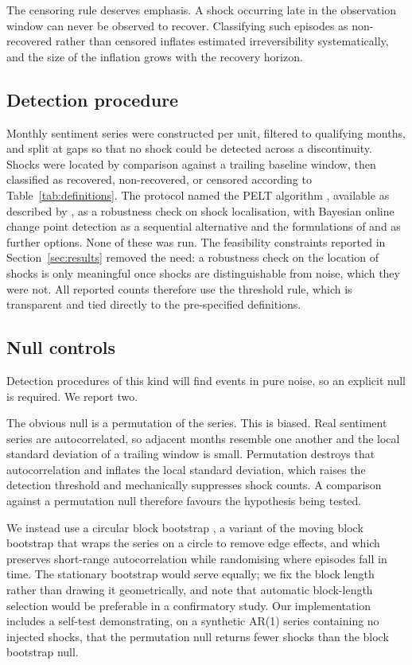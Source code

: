 \documentclass[11pt,a4paper]{article}
\makeatletter
\let\original@subsection\subsection
\renewcommand{\subsection}{\FloatBarrier\original@subsection}%
\makeatother
\begin{document}
The censoring rule deserves emphasis. A shock occurring late in the
observation window can never be observed to recover. Classifying such episodes
as non-recovered rather than censored inflates estimated irreversibility
systematically, and the size of the inflation grows with the recovery horizon.

\subsection{Detection procedure}

Monthly sentiment series were constructed per unit, filtered to qualifying
months, and split at gaps so that no shock could be detected across a
discontinuity. Shocks were located by comparison against a trailing baseline window, then
classified as recovered, non-recovered, or censored according to
Table~\ref{tab:definitions}. The protocol named the PELT algorithm \citep{killick2012}, available as
described by \citet{killick2014}, as a robustness check on shock localisation,
with Bayesian online change point detection \citep{adams2007} as a sequential
alternative and the formulations of \citet{barry1993} and \citet{fearnhead2007}
as further options. None of these was run. The feasibility constraints reported
in Section~\ref{sec:results} removed the need: a robustness check on the
location of shocks is only meaningful once shocks are distinguishable from
noise, which they were not. All reported counts therefore use the threshold
rule, which is transparent and tied directly to the pre-specified
definitions.

\subsection{Null controls}
\label{sec:nulls}

Detection procedures of this kind will find events in pure noise, so an
explicit null is required. We report two.

The obvious null is a permutation of the series. This is biased. Real
sentiment series are autocorrelated, so adjacent months resemble one another
and the local standard deviation of a trailing window is small. Permutation
destroys that autocorrelation and inflates the local standard deviation, which
raises the detection threshold and mechanically suppresses shock counts. A
comparison against a permutation null therefore favours the hypothesis being
tested.

We instead use a circular block bootstrap \citep{politis1992}, a variant of the
moving block bootstrap \citep{kunsch1989} that wraps the series on a circle to
remove edge effects, and which preserves short-range autocorrelation while
randomising where episodes fall in time. The stationary bootstrap
\citep{politis1994} would serve equally; we fix the block length rather than
drawing it geometrically, and note that automatic block-length selection
\citep{politis2004, patton2009} would be preferable in a confirmatory study. Our
implementation includes a self-test demonstrating, on a synthetic AR(1) series
containing no injected shocks, that the permutation null returns fewer shocks
than the block bootstrap null.
\end{document}
